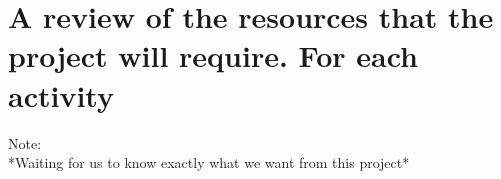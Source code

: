 \section{A review of the resources that the project will require. For each activity}

Note:\\
*Waiting for us to know exactly what we want from this project*